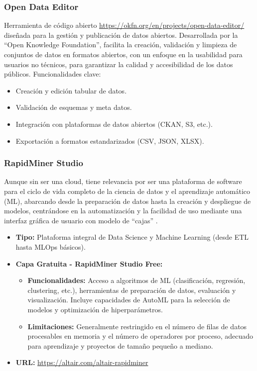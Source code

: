 \subsubsection*{Open Data Editor}
	Herramienta de código abierto \url{https://okfn.org/en/projects/open-data-editor/} diseñada para la gestión y publicación de datos abiertos. Desarrollada por la ``Open Knowledge Foundation'', facilita la creación, validación y limpieza de conjuntos de datos en formatos abiertos, con un enfoque en la usabilidad para usuarios no técnicos, para garantizar la calidad y accesibilidad de los datos públicos. Funcionalidades clave:
	\begin{itemize}
		\item Creación y edición tabular de datos.
		\item Validación de esquemas y meta datos.
		\item Integración con plataformas de datos abiertos (CKAN, S3, etc.).
		\item Exportación a formatos estandarizados (CSV, JSON, XLSX).
	\end{itemize}
	
\subsubsection*{RapidMiner Studio}
Aunque sin ser una cloud, tiene relevancia por ser una plataforma de software para el ciclo de vida completo de la ciencia de datos y el aprendizaje automático (ML), abarcando desde la preparación de datos hasta la creación y despliegue de modelos, centrándose en la automatización y la facilidad de uso mediante una interfaz gráfica de usuario con modelo de ``cajas'' \citep{RapidMinerCourse}. 
\begin{itemize}
	\item \textbf{Tipo:} Plataforma integral de Data Science y Machine Learning (desde ETL hasta MLOps básicos).
	\item \textbf{Capa Gratuita - RapidMiner Studio Free:} 
	\begin{itemize}
		\item \textbf{Funcionalidades:} Acceso a algoritmos de ML (clasificación, regresión, clustering, etc.), herramientas de preparación de datos, evaluación y visualización. Incluye capacidades de AutoML para la selección de modelos y optimización de hiperparámetros.
		\item \textbf{Limitaciones:} Generalmente restringido en el número de filas de datos procesables en memoria y el número de operadores por proceso, adecuado para aprendizaje y proyectos de tamaño pequeño a mediano.
	\end{itemize}
	\item \textbf{URL:} \url{https://altair.com/altair-rapidminer}
\end{itemize}

